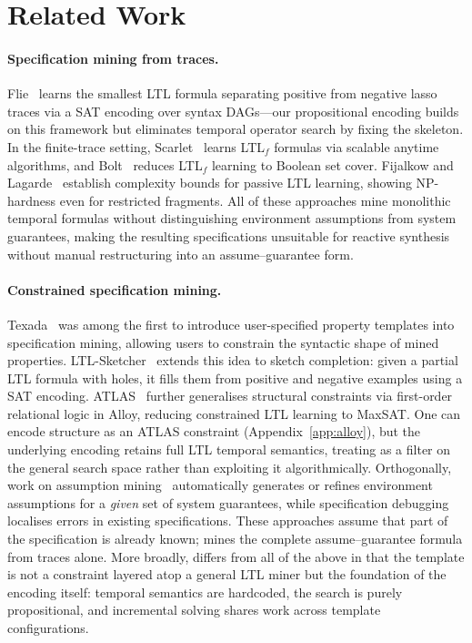 \section{Related Work}\label{sec:related}

\paragraph{Specification mining from traces.}
Flie~\cite{NeiderG18} learns the smallest LTL formula separating
positive from negative lasso traces via a SAT encoding over syntax
DAGs---our propositional encoding builds on this framework but
eliminates temporal operator search by fixing the \GRone skeleton.
In the finite-trace setting,
Scarlet~\cite{RahaRFV22} learns LTL$_f$ formulas via scalable
anytime algorithms, and
Bolt~\cite{BathieFMMV26} reduces LTL$_f$ learning to Boolean set
cover.
Fijalkow and Lagarde~\cite{FijalkowL21} establish complexity bounds
for passive LTL learning, showing NP-hardness even for restricted
fragments.
All of these approaches mine monolithic temporal formulas without
distinguishing environment assumptions from system guarantees,
making the resulting specifications unsuitable for reactive synthesis
without manual restructuring into an assume--guarantee form.

\paragraph{Constrained specification mining.}
Texada~\cite{LemieuxDB15} was among the first to introduce
user-specified property templates into specification mining, allowing
users to constrain the syntactic shape of mined properties.
LTL-Sketcher~\cite{LutzNR23} extends this idea to sketch
completion: given a partial LTL formula with holes, it fills them
from positive and negative examples using a SAT encoding.
ATLAS~\cite{ZhangCGD25} further generalises structural constraints
via first-order relational logic in Alloy, reducing constrained LTL
learning to MaxSAT.
One can encode \GRone structure as an ATLAS constraint
(Appendix~\ref{app:alloy}), but the underlying encoding retains
full LTL temporal semantics, treating \GRone as a filter on the
general search space rather than exploiting it algorithmically.
Orthogonally, work on \GRone assumption
mining~\cite{ChatterjeeHJ08,LiDS11} automatically generates or
refines environment assumptions for a \emph{given} set of system
guarantees, while specification
debugging~\cite{KonighoferHB13} localises errors in existing
\GRone specifications.
These approaches assume that part of the specification is already
known; \toolname mines the complete assume--guarantee formula from
traces alone.
More broadly, \toolname differs from all of the above in that the
\GRone template is not a constraint layered atop a general LTL miner
but the foundation of the encoding itself: temporal semantics are
hardcoded, the search is purely propositional, and incremental
solving shares work across template configurations.
